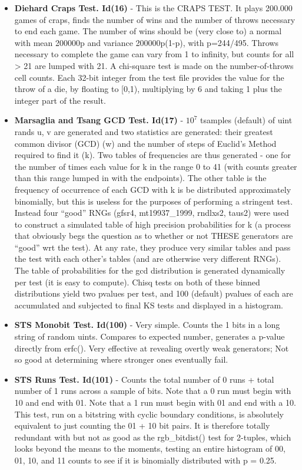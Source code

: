 \begin{itemize}
   \item \textbf{Diehard Craps Test. Id(16)} - This is the CRAPS TEST. It plays 200.000 games of craps, finds  the number of wins and the number of throws necessary to end  each game.  The number of wins should be (very close to) a normal with mean 200000p and variance 200000p(1-p), with p=244/495.  Throws necessary to complete the game can vary from 1 to infinity, but counts for all > 21 are lumped with 21. A chi-square test is made on the number-of-throws cell counts. Each 32-bit integer from the test file provides the value for the throw of a die, by floating to [0,1), multiplying by 6 and taking 1 plus the integer part of the result.
   
   \item \textbf{Marsaglia and Tsang GCD Test. Id(17)} - $10^7$ tsamples (default) of uint rands u, v are generated and two statistics are generated: their greatest common divisor (GCD) (w) and the number of steps of Euclid's Method required to find it (k). Two tables of frequencies are thus generated - one for the number of times each value for k in the range 0 to 41 (with counts greater than this range lumped in with the endpoints). The other table is the frequency of occurrence of each GCD with k is be distributed approximately binomially, but this is useless for the purposes of performing a stringent test.  Instead four ``good'' RNGs (gfsr4, mt19937\_1999, rndlxs2, taus2) were used to construct a simulated table of high precision probabilities for k (a process that obviously begs the question as to whether or not THESE generators are ``good'' wrt the test). At any rate, they produce very similar tables and pass the test with each other's tables (and are otherwise very different RNGs).  The table of probabilities for the gcd distribution is generated dynamically per test (it is easy to compute).  Chisq tests on both of these binned distributions yield two p\-values per test, and 100 (default) p\-values of each are accumulated and subjected to final KS tests and displayed in a histogram.
   
   \item \textbf{STS Monobit Test. Id(100)} - Very simple. Counts the 1 bits in a long string of random uints. Compares to expected number, generates a p-value directly from erfc().  Very effective at revealing overtly weak generators; Not so good at determining where stronger ones eventually fail.
   
   \item \textbf{STS Runs Test. Id(101)} - Counts the total number of 0 runs + total number of 1 runs across a sample of bits.  Note that a 0 run must begin with 10 and end with 01.  Note that a 1 run must begin with 01 and end with a 10. This test, run on a bitstring with cyclic boundary conditions, is absolutely equivalent to just counting the 01 + 10 bit pairs. It is therefore totally redundant with but not as good as the rgb\_bitdist() test for 2-tuples, which looks beyond the means to the moments, testing an entire histogram  of 00, 01, 10, and 11 counts to see if it is binomially distributed with p = 0.25.
   

\end{itemize}
